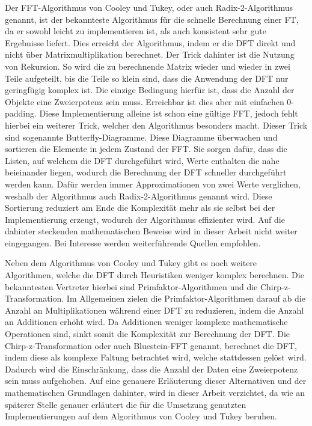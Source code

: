 Der \ac{FFT}-Algorithmus von Cooley und Tukey, oder auch Radix-2-Algorithmus genannt, ist der bekannteste Algorithmus für die schnelle Berechnung einer \ac{FT}, da er sowohl leicht zu implementieren ist, als auch konsistent sehr gute Ergebnisse liefert. \cite[156ff.]{Meyer2000} 
Dies erreicht der Algorithmus, indem er die \ac{DFT} direkt und nicht über Matrixmultiplikation berechnet. Der Trick dahinter ist die Nutzung von Rekursion. So wird die zu berechnende Matrix wieder und wieder in zwei Teile aufgeteilt, bis die Teile so klein sind, dass die Anwendung der \ac{DFT} nur geringfügig komplex ist. Die einzige Bedingung hierfür ist, dass die Anzahl der Objekte eine Zweierpotenz sein muss. \cite{Rabiner1969} Erreichbar ist dies aber mit einfachen 0-padding. \cite[41 ff.]{Aamir2005} Diese Implementierung alleine ist schon eine gültige \ac{FFT}, jedoch fehlt hierbei ein weiterer Trick, welcher den Algorithmus besonders macht. Dieser Trick sind sogenannte Butterfly-Diagramme. Diese Diagramme überwachen und sortieren die Elemente in jedem Zustand der \ac{FFT}. Sie sorgen dafür, dass die Listen, auf welchem die \ac{DFT} durchgeführt wird, Werte enthalten die nahe beieinander liegen, wodurch die Berechnung der DFT schneller durchgeführt werden kann. \cite[3ff.]{Burrus2009} \cite[7]{Heckbert1995} Dafür werden immer Approximationen von zwei Werte verglichen, weshalb der Algorithmus auch Radix-2-Algorithmus genannt wird.  Diese Sortierung reduziert am Ende die Komplexität mehr als sie selbst bei der Implementierung erzeugt, wodurch der Algorithmus effizienter wird. Auf die dahinter steckenden mathematischen Beweise wird in dieser Arbeit nicht weiter eingegangen.  Bei Interesse werden weiterführende Quellen empfohlen.  \cite[9f.]{Heckbert1995} \cite{Bekele2016}

Neben dem Algorithmus von Cooley und Tukey gibt es noch weitere Algorithmen, welche die \ac{DFT} durch Heuristiken weniger komplex berechnen. Die bekanntesten Vertreter hierbei sind Primfaktor-Algorithmen und die Chirp-z-Transformation. Im Allgemeinen zielen die Primfaktor-Algorithmen darauf ab die Anzahl an Multiplikationen während einer \ac{DFT} zu reduzieren, indem die Anzahl an Additionen erhöht wird. Da Additionen weniger komplexe mathematische Operationen sind, sinkt somit die Komplexität zur Berechnung der \ac{DFT}. \cite{Temperton1992} Die Chirp-z-Transformation oder auch Bluestein-FFT genannt, berechnet die \ac{DFT}, indem diese als komplexe Faltung betrachtet wird, welche stattdessen gelöst wird. Dadurch wird die Einschränkung, dass die Anzahl der Daten eine Zweierpotenz sein muss aufgehoben. \cite{Rabiner1969} Auf eine genauere Erläuterung dieser Alternativen und der mathematischen Grundlagen dahinter, wird in dieser Arbeit verzichtet, da wie an späterer Stelle genauer erläutert die für die Umsetzung genutzten Implementierungen auf dem Algorithmus von Cooley und Tukey beruhen.

